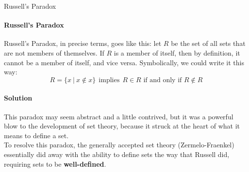 \begin{proc}{Russell's Paradox}
\paragraph{Russell's Paradox} Russell's Paradox, in precise terms, goes like this: let $R$ be the set of all sets that are not members of themselves.  If $R$ is a member of itself, then by definition, it cannot be a member of itself, and vice versa.  Symbolically, we could write it this way:
\[R = \{x\ |\ x \notin x\} \ \ \textrm{implies}\ \ R \in R \textrm{ if and only if } R \notin R\]

\paragraph{Solution} This paradox may seem abstract and a little contrived, but it was a powerful blow to the development of set theory, because it struck at the heart of what it means to define a set.\\

To resolve this paradox, the generally accepted set theory (Zermelo-Fraenkel) essentially did away with the ability to define sets the way that Russell did, requiring sets to be \textbf{well-defined}.
\end{proc}